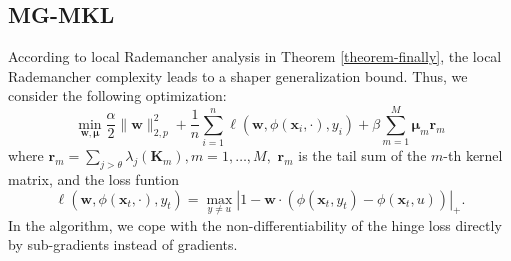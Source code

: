 \documentclass{article}
\begin{document}
\subsection{MG-MKL}
According to local Rademancher analysis in Theorem \ref{theorem-finally},
the local Rademancher complexity leads to a shaper generalization bound.
Thus, we consider the following optimization:
\begin{equation}
\label{optimization-problem}
    \min_{\mathbf{w},\bm \mu} \frac{\alpha}{2}\|\mathbf{w}\|_{2,p}^2
    +\frac{1}{n}\sum_{i=1}^n\ell(\mathbf{w},\phi(\mathbf{x}_i,\cdot), y_i)
    +\beta\sum_{m=1}^M\mathbf{\mu}_m\mathbf{r}_m
\end{equation}
where
$\mathbf{r}_m=\sum_{j>\theta}\lambda_j(\mathbf{K}_m), m=1,\ldots, M,$
$\mathbf{r}_m$ is the tail sum of the $m$-th kernel matrix,
and the loss funtion
$$\ell(\mathbf{w},\phi(\mathbf{x}_t,\cdot), y_t)=
\max\limits_{y \not= u}|1-\mathbf{w} \cdot(\phi(\mathbf{x}_t,y_t)-\phi(\mathbf{x}_t,u))|_+.$$
In the algorithm, we cope with the non-differentiability of the hinge loss directly by sub-gradients instead of gradients.
\end{document}
